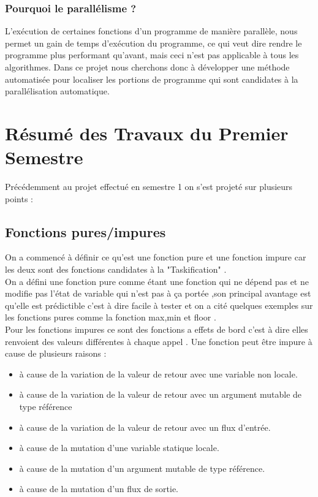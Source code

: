 \documentclass[12pt,titlepage]{article}
\begin{document}
\subsubsection{Pourquoi le parallélisme ?}

 L’exécution de  certaines fonctions d'un programme de manière parallèle, nous permet un gain de temps d'exécution du programme, ce qui veut dire rendre le programme plus performant qu'avant, mais ceci n'est pas applicable à tous les algorithmes. Dans ce projet nous cherchons donc à développer une méthode automatisée pour localiser les portions de programme qui sont candidates à la parallélisation automatique.

\section{Résumé des Travaux du Premier Semestre}

Précédemment au projet effectué en semestre 1 on s'est projeté sur plusieurs points : 

\subsection{Fonctions pures/impures}
On a commencé à définir ce qu'est une fonction pure et une fonction impure car les deux sont des fonctions candidates à la "Taskification" .\\
On a défini une fonction pure comme étant une fonction qui ne dépend pas et ne modifie pas l'état de variable qui n'est pas à ça portée ,son principal avantage est qu'elle est prédictible c'est à dire facile à tester  et on a cité quelques exemples sur les fonctions pures comme la fonction max,min et floor .\\
Pour les fonctions impures ce sont des fonctions a effets de bord c'est à dire elles renvoient des valeurs différentes à chaque appel . Une fonction peut être impure à cause de plusieurs raisons :
    \begin{itemize}

    \item à cause de la variation de la valeur de retour avec une variable non locale.
    \item à cause de la variation de la valeur de retour avec un argument mutable de type référence
    \item à cause de la variation de la valeur de retour avec un flux d’entrée.
    \item à cause de la mutation d’une variable statique locale.
    \item à cause de la mutation d’un argument mutable de type référence.
    \item à cause de la mutation d’un flux de sortie.
\end{itemize}
\end{document}
